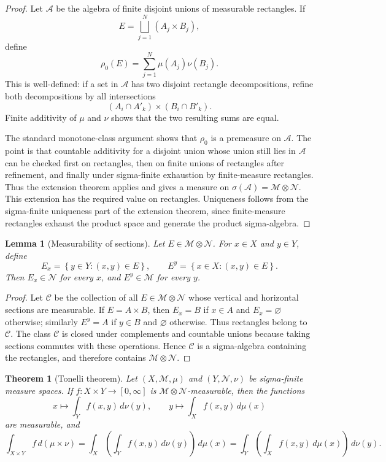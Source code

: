 \documentclass[11pt,openany]{book}
\numberwithin{equation}{chapter}
\theoremstyle{definition}
\theoremstyle{plain}
\newtheorem{theorem}[definition]{Theorem}
\newtheorem{lemma}[definition]{Lemma}
\theoremstyle{remark}
\newcommand{\M}{\mathcal{M}}
\newcommand{\A}{\mathcal{A}}
\newcommand{\1}{\mathbf{1}}
\newcommand{\dd}{\,d}
\newcommand{\set}[1]{\left\{#1\right\}}
\begin{document}
\begin{proof}
Let \(\A\) be the algebra of finite disjoint unions of measurable rectangles. If
\[
  E=\bigsqcup_{j=1}^N(A_j\times B_j),
\]
define
\[
  \rho_0(E)=\sum_{j=1}^N\mu(A_j)\nu(B_j).
\]
This is well-defined: if a set in \(\A\) has two disjoint rectangle decompositions, refine both decompositions by all intersections
\[
  (A_i\cap A'_k)\times(B_i\cap B'_k).
\]
Finite additivity of \(\mu\) and \(\nu\) shows that the two resulting sums are equal.

The standard monotone-class argument shows that \(\rho_0\) is a premeasure on \(\A\). The point is that countable additivity for a disjoint union whose union still lies in \(\A\) can be checked first on rectangles, then on finite unions of rectangles after refinement, and finally under sigma-finite exhaustion by finite-measure rectangles. Thus the extension theorem applies and gives a measure on \(\sigma(\A)=\M\otimes\mathcal N\). This extension has the required value on rectangles. Uniqueness follows from the sigma-finite uniqueness part of the extension theorem, since finite-measure rectangles exhaust the product space and generate the product sigma-algebra.
\end{proof}

\begin{lemma}[Measurability of sections]
Let \(E\in\M\otimes\mathcal N\). For \(x\in X\) and \(y\in Y\), define
\[
  E_x=\set{y\in Y:(x,y)\in E},
  \qquad
  E^y=\set{x\in X:(x,y)\in E}.
\]
Then \(E_x
\in\mathcal N\) for every \(x\), and \(E^y\in\M\) for every \(y\).
\end{lemma}

\begin{proof}
Let \(\mathcal C\) be the collection of all \(E\in\M\otimes\mathcal N\) whose vertical and horizontal sections are measurable. If \(E=A\times B\), then \(E_x=B\) if \(x\in A\) and \(E_x=\varnothing\) otherwise; similarly \(E^y=A\) if \(y\in B\) and \(\varnothing\) otherwise. Thus rectangles belong to \(\mathcal C\). The class \(\mathcal C\) is closed under complements and countable unions because taking sections commutes with these operations. Hence \(\mathcal C\) is a sigma-algebra containing the rectangles, and therefore contains \(\M\otimes\mathcal N\).
\end{proof}

\begin{theorem}[Tonelli theorem]
Let \((X,\M,\mu)\) and \((Y,\mathcal N,\nu)\) be sigma-finite measure spaces. If \(f:X\times Y\to[0,\infty]\) is \(\M\otimes\mathcal N\)-measurable, then the functions
\[
  x\mapsto\int_Y f(x,y)\dd\nu(y),
  \qquad
  y\mapsto\int_X f(x,y)\dd\mu(x)
\]
are measurable, and
\[
  \int_{X\times Y}f\dd(\mu\times\nu)
  =\int_X\left(\int_Y f(x,y)\dd\nu(y)\right)\dd\mu(x)
  =\int_Y\left(\int_X f(x,y)\dd\mu(x)\right)\dd\nu(y).
\]
\end{theorem}
\end{document}
